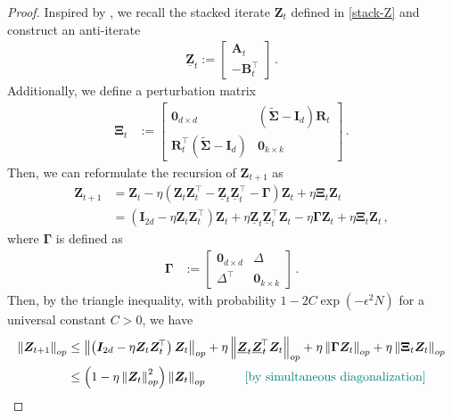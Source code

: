\begin{proof}
    Inspired by \cite{soltanolkotabi2023implicit}, we recall the stacked iterate $\bm Z_t$ defined in \cref{stack-Z} and construct an anti-iterate
    \begin{align*}
        \underline{\bm Z}_t:=\begin{bmatrix}
            \bm A_t \\ -\bm B_t^{\!\top}
        \end{bmatrix}\,.
    \end{align*}
Additionally, we define a perturbation matrix
    \begin{align*}
        \bm \Xi_t & := \begin{bmatrix}
            \bm 0_{d\times d} & \left(\widetilde{\bm \Sigma}-\bm I_d\right)\bm R_t \\
            \bm R_t^{\!\top}\left(\widetilde{\bm \Sigma}-\bm I_d\right) & \bm 0_{k\times k}
        \end{bmatrix}\,.
    \end{align*}
    Then, we can reformulate the recursion of $\bm Z_{t+1}$ as
    \begin{align*}
        \bm Z_{t+1} & = \bm Z_t - \eta \left(\bm Z_t\bm Z_t^{\!\top}-\underline{\bm Z}_t\underline{\bm Z}_t^{\!\top}-\bm \Gamma\right)\bm Z_t+\eta \bm \Xi_t \bm Z_t\\
        & = \left(\bm I_{2d}-\eta\bm Z_t\bm Z_t^{\!\top}\right)\bm Z_t+\eta\underline{\bm Z}_t\underline{\bm Z}_t^{\!\top}\bm Z_t-\eta \bm \Gamma \bm Z_t+\eta \bm \Xi_t \bm Z_t\,,
    \end{align*}
    where $\bm \Gamma$ is defined as
    \begin{align*}
        \bm \Gamma & := \begin{bmatrix}
            \bm 0_{d\times d} & \Delta \\
            \Delta^{\!\top} & \bm 0_{k\times k}
        \end{bmatrix}\,.
    \end{align*}
    Then, by the triangle inequality, with probability $1- 2C\exp(-\epsilon^2 N)$ for a universal constant $C>0$, we have
    \begin{align*}
        \left\|\bm Z_{t+1}\right\|_{op} & \leq \left\|\left(\bm I_{2d}-\eta\bm Z_t\bm Z_t^{\!\top}\right)\bm Z_t\right\|_{op}+\eta\left\|\underline{\bm Z}_t\underline{\bm Z}_t^{\!\top}\bm Z_t\right\|_{op}+\eta\left\|\bm \Gamma \bm Z_t\right\|_{op}+\eta \left\|\bm \Xi_t \bm Z_t\right\|_{op}\\
        & \leq \left(1-\eta \left\|\bm Z_{t}\right\|_{op}^2\right)\left\|\bm Z_{t}\right\|_{op}\quad\tag*{\color{teal}[by simultaneous diagonalization]}\\

\end{align*}
\end{proof}
